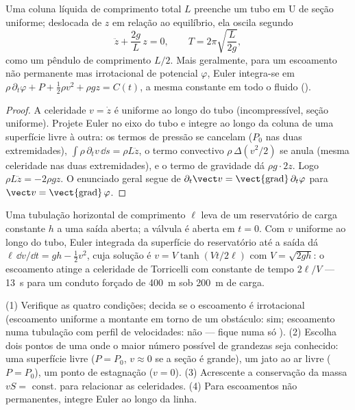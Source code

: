 \begin{proposition}\label{prop:b2:euler-bernoulli:utube}
Uma coluna líquida de comprimento total $L$ preenche um tubo em U de seção uniforme;
deslocada de $z$ em relação ao equilíbrio, ela oscila segundo
\[
\ddot z + \frac{2g}{L}\,z = 0 , \qquad T = 2\pi\sqrt{\frac{L}{2g}} ,
\]
como um pêndulo de comprimento $L/2$. Mais geralmente, para um escoamento não permanente mas
irrotacional de potencial $\varphi$, Euler integra-se em
$\rho\,\partial_t\varphi + P + \tfrac12\rho v^2 + \rho gz = C(t)$, a mesma
constante em todo o fluido ().
\end{proposition}

\begin{proof}
A celeridade $v = \dot z$ é uniforme ao longo do tubo (incompressível,
seção uniforme). Projete Euler no eixo do tubo e integre ao longo
da coluna de uma superfície livre à outra: os termos de pressão se
cancelam ($P_0$ nas duas extremidades), $\int\rho\,\partial_tv\,\dd s = \rho L\ddot z$, o
termo convectivo $\rho\,\Delta(v^2/2)$ se anula (mesma celeridade nas duas extremidades),
e o termo de gravidade dá $\rho g\cdot2z$. Logo $\rho L\ddot z = -2\rho gz$.
O enunciado geral segue de $\partial_t\vect v = \operatorname{\vect{grad}}
\partial_t\varphi$ para $\vect v = \operatorname{\vect{grad}}\varphi$.
\end{proof}

\begin{example}\label{ex:b2:euler-bernoulli:start}
Uma tubulação horizontal de comprimento $\ell$ leva de um reservatório de carga constante
$h$ a uma saída aberta; a válvula é aberta em $t = 0$. Com $v$ uniforme
ao longo do tubo, Euler integrada da superfície do reservatório até a
saída dá $\ell\,\dd v/\dd t = gh - \tfrac12v^2$, cuja solução é
$v = V\tanh(Vt/2\ell)$ com $V = \sqrt{2gh}$: o escoamento atinge a celeridade de
Torricelli com constante de tempo $2\ell/V$ --- \qty{13}{s} para um conduto forçado de \qty{400}{m}
sob \qty{200}{m} de carga.
\end{example}

\begin{method}\label{met:b2:euler-bernoulli:method}
(1) Verifique as quatro condições; decida se o escoamento é irrotacional
(escoamento uniforme a montante em torno de um obstáculo: sim; escoamento numa tubulação com
perfil de velocidades: não --- fique numa só ). (2) Escolha dois pontos
de uma  onde o maior número possível de grandezas seja conhecido: uma superfície
livre ($P = P_0$, $v \approx 0$ se a seção é grande), um jato ao
ar livre ($P = P_0$), um ponto de estagnação ($v = 0$). (3) Acrescente a conservação
da massa $vS = $ const. para relacionar as celeridades. (4) Para escoamentos
não permanentes, integre Euler ao longo da linha.
\end{method}


